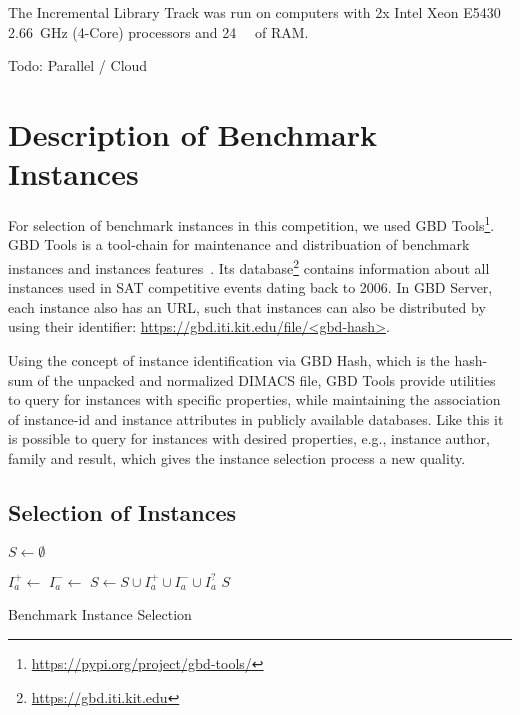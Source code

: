 \documentclass{elsarticle}
\newcommand{\todo}[1]{{\color{purple}Todo: #1}}
\begin{document}
The Incremental Library Track was run on computers with 2x Intel Xeon E5430 \SI{2.66}{\giga\hertz}
(4-Core) processors and \SI{24}{\giga\byte} of RAM.

\todo{Parallel / Cloud}

\section{Description of Benchmark Instances}
\label{sec:instances}

For selection of benchmark instances in this competition, we used GBD Tools\footnote{\url{https://pypi.org/project/gbd-tools/}}. 
GBD Tools is a tool-chain for maintenance and distribuation of benchmark instances and instances features~\cite{Iser:2018:GBD}. 
Its database\footnote{\url{https://gbd.iti.kit.edu}} contains information about all instances used in SAT competitive events dating back to 2006. 
In GBD Server, each instance also has an URL, such that instances can also be distributed by using their identifier: \url{https://gbd.iti.kit.edu/file/<gbd-hash>}.

Using the concept of instance identification via GBD Hash, which is the hash-sum of the unpacked and normalized DIMACS file, GBD Tools provide utilities to query for instances with specific properties, while maintaining the association of instance-id and instance attributes in publicly available databases.
Like this it is possible to query for instances with desired properties, e.g., instance author, family and result, which gives the instance selection process a new quality. 


\subsection{Selection of Instances}

\begin{algorithm}[t]
\DontPrintSemicolon

\BlankLine
$S \leftarrow \emptyset$\;

 {
	$I_a^+ \leftarrow$ \;	
	$I_a^- \leftarrow$ \;	
	$S \leftarrow S \cup I_a^+ \cup I_a^- \cup I_a^?$\;	
}
\Return $S$\;

\caption{Benchmark Instance Selection}
\label{algo:select}
\end{algorithm}
\end{document}
